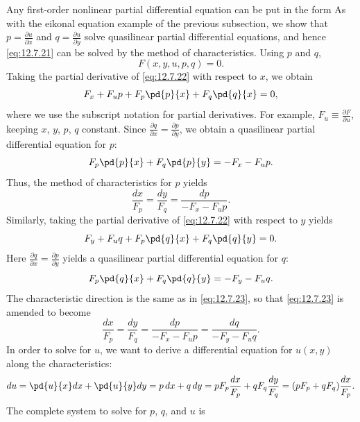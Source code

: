 Any first-order nonlinear partial differential equation can be put in the form
As with the eikonal equation example of the previous subsection, we show that $p = \frac{\partial u}{\partial x}$ and $q = \frac{\partial u}{\partial y}$ solve quasilinear partial differential equations, and hence \eqref{eq:12.7.21} can be solved by the method of characteristics.  Using $p$ and $q$,
\begin{equation}
\label{eq:12.7.22}
F(x, y, u, p, q) = 0.
\end{equation}
Taking the partial derivative of \eqref{eq:12.7.22} with respect to $x$, we obtain
\[
F_x + F_u p + F_p \pd{p}{x} + F_q \pd{q}{x} = 0,
\]
where we use the subscript notation for partial derivatives.  For example, $F_u \equiv \frac{\partial F}{\partial u}$, keeping $x$, $y$, $p$, $q$ constant.  Since $\frac{\partial q}{\partial x} = \frac{\partial p}{\partial y}$, we obtain a quasilinear partial differential equation for $p$:
\[
F_p\pd{p}{x} + F_q\pd{p}{y} = -F_x - F_u p.
\]
Thus, the method of characteristics for $p$ yields
\begin{equation}
\label{eq:12.7.23}
\frac{dx}{F_p} = \frac{dy}{F_q} = \frac{dp}{-F_x - F_u p}.
\end{equation}
Similarly, taking the partial derivative of \eqref{eq:12.7.22} with respect to $y$ yields
\[
F_y + F_u q + F_p\pd{q}{x} + F_q\pd{q}{y} = 0.
\]
Here $\frac{\partial q}{\partial x} = \frac{\partial p}{\partial y}$ yields a quasilinear partial differential equation for $q$:
\[
F_p\pd{q}{x} + F_q\pd{q}{y} = -F_y - F_u q.
\]
The characteristic direction is the same as in \eqref{eq:12.7.23}, so that \eqref{eq:12.7.23} is amended to become
\begin{equation}
\label{eq:12.7.24}
\frac{dx}{F_p} = \frac{dy}{F_q} = \frac{dp}{-F_x - F_u p} = \frac{dq}{-F_y - F_u q}.
\end{equation}
In order to solve for $u$, we want to derive a differential equation for $u(x,y)$ along the characteristics:
\[
du = \pd{u}{x}dx + \pd{u}{y}dy = p\,dx + q\,dy = pF_p\frac{dx}{F_p} + qF_q\frac{dy}{F_q} = (pF_p + qF_q)\frac{dx}{F_p}.
\]
The complete system to solve for $p$, $q$, and $u$ is

